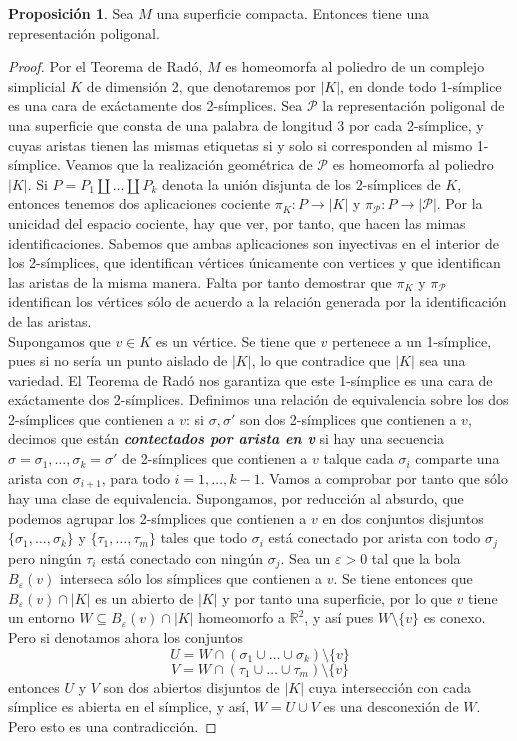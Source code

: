 \documentclass[10pt]{report}
\newcommand{\R}{\mathbb{R}}
\newcommand{\enfatiza}[1]{\textbf{\textit{#1}}}
\theoremstyle{definition}
\newtheorem{prop}[defin]{Proposición}
\begin{document}
\begin{prop}\label{prop:superficie_tiene_representacion}%
Sea $M$ una superficie compacta. Entonces tiene una representación poligonal.
\end{prop}
\begin{proof}
Por el Teorema de Radó, $M$ es homeomorfa al poliedro de un complejo simplicial $K$ de dimensión 2, que denotaremos por $|K|$, en donde todo 1-símplice es una cara de exáctamente dos 2-símplices.
Sea $\mathcal{P}$ la representación poligonal de una superficie que consta de una palabra de longitud 3 por cada 2-símplice, y cuyas aristas tienen las mismas etiquetas si y solo si corresponden al mismo 1-símplice. Veamos que la realización geométrica de $\mathcal{P}$ es homeomorfa al poliedro $|K|$.
Si $P=P_1\amalg \dots \amalg P_k$ denota la unión disjunta de los 2-símplices de $K$, entonces tenemos dos aplicaciones cociente $\pi_K :P\to |K|$ y $\pi_{\mathcal{P}} :P\to |\mathcal{P}|$. Por la unicidad del espacio cociente, hay que ver, por tanto, que hacen las mimas identificaciones. Sabemos que ambas aplicaciones son inyectivas en el interior de los 2-símplices, que identifican vértices únicamente con vertices y que identifican las aristas de la misma manera. Falta por tanto demostrar que $\pi_K$ y $\pi_{\mathcal{P}}$ identifican los vértices sólo de acuerdo a la relación generada por la identificación de las aristas.\\
Supongamos que $v\in K$ es un vértice. Se tiene que $v$ pertenece a un 1-símplice, pues si no sería un punto aislado de $|K|$, lo que contradice que $|K|$ sea una variedad. El Teorema de Radó nos garantiza que este 1-símplice es una cara de exáctamente dos 2-símplices. Definimos una relación de equivalencia sobre los dos 2-símplices que contienen a $v$: si $\sigma , \sigma '$ son dos 2-símplices que contienen a $v$, decimos que están \enfatiza{contectados por arista en v} si hay una secuencia $\sigma =\sigma_1 ,\dots ,\sigma_k =\sigma '$ de 2-símplices que contienen a $v$ talque cada $\sigma_i$ comparte una arista con $\sigma_{i+1}$,  para todo $i=1,\dots , k-1$. Vamos a comprobar por tanto que sólo hay una clase de equivalencia. Supongamos, por reducción al absurdo, que podemos agrupar los 2-símplices que contienen a $v$ en dos conjuntos disjuntos $\{ \sigma_1 ,\dots ,\sigma_k \}$ y $\{ \tau_1 ,\dots ,\tau_m \}$ tales que todo $\sigma_i$ está conectado por arista con todo $\sigma_j$ pero ningún $\tau_i$ está conectado con ningún $\sigma_j$. Sea un $\varepsilon >0$ tal que la bola $B_{\varepsilon}(v)$ interseca sólo los símplices que contienen a $v$.  Se tiene entonces que $B_{\varepsilon}(v)\cap |K|$ es un abierto de $|K|$ y por tanto una superficie, por lo que $v$ tiene un entorno $W\subseteq B_{\varepsilon}(v)\cap |K|$ homeomorfo a $\R^2$, y así pues $W\setminus \{ v \}$ es conexo. 
Pero si denotamos ahora los conjuntos $$U=W\cap (\sigma_1 \cup \dots \cup \sigma_k )\setminus \{ v \}$$
$$V=W\cap (\tau_1 \cup \dots \cup \tau_m )\setminus \{ v \}$$ entonces $U$ y $V$ son dos abiertos disjuntos de $|K|$ cuya intersección con cada símplice es abierta en el símplice, y así, $W=U\cup V$ es una desconexión de $W$. Pero esto es una contradicción.
\end{proof}
\end{document}
